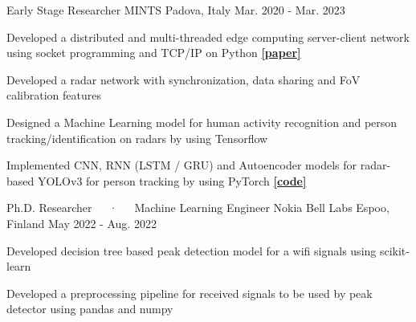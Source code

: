 

\begin{cventries}

  \cventry
    {Early Stage Researcher} %
    {MINTS} %
    {Padova, Italy} %
    {Mar. 2020 - Mar. 2023} %
    {
      \begin{cvitems} %
        \item {Developed a distributed and multi-threaded edge computing server-client network using socket programming and TCP/IP on Python \href{https://dl.acm.org/doi/abs/10.1145/3565474.3569068}{\textbf{[paper]}}}
        \item {Developed a radar network with synchronization, data sharing and FoV calibration features}
        \item {Designed a Machine Learning model for human activity recognition and person tracking/identification on radars by using Tensorflow}
        \item {Implemented CNN, RNN (LSTM / GRU) and Autoencoder models for radar-based YOLOv3 for person tracking by using PyTorch \href{https://github.com/enverbashirov/YOLOv3-mMwave-Radar}{\textbf{[code]}}}
      \end{cvitems}
    }

  \cventry
    {Ph.D. Researcher~~~·~~~Machine Learning Engineer} %
    {Nokia Bell Labs} %
    {Espoo, Finland} %
    {May  2022 - Aug. 2022} %
    {
      \begin{cvitems} %
        \item {Developed decision tree based peak detection model for a wifi signals using scikit-learn}
        \item {Developed a preprocessing pipeline for received signals to be used by peak detector using pandas and numpy}
      \end{cvitems}
    }


\end{cventries}
